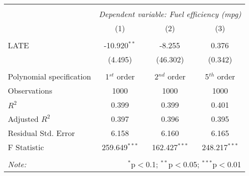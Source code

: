 \begin{tabular}{@{\extracolsep{5pt}}lccc}
\\[-1.8ex]\hline
\hline \\[-1.8ex]
& \multicolumn{3}{c}{\textit{Dependent variable: Fuel efficiency (mpg)}} \
\cr \cline{2-4}
\\[-1.8ex] & (1) & (2) & (3) \\
\hline \\[-1.8ex]
 LATE & -10.920$^{**}$ & -8.255$^{}$ & 0.376$^{}$ \\
& (4.495) & (46.302) & (0.342) \\
\hline \\[-1.8ex]
 Polynomial specification & 1$^{st}$ order & 2$^{nd}$ order & 5$^{th}$ order \\
 Observations & 1000 & 1000 & 1000 \\
 $R^2$ & 0.399 & 0.399 & 0.401 \\
 Adjusted $R^2$ & 0.397 & 0.396 & 0.395 \\
 Residual Std. Error & 6.158 & 6.160 & 6.165 \\
 F Statistic & 259.649$^{***}$ & 162.427$^{***}$ & 248.217$^{***}$ \\
\hline
\hline \\[-1.8ex]
\textit{Note:} & \multicolumn{3}{r}{$^{*}$p$<$0.1; $^{**}$p$<$0.05; $^{***}$p$<$0.01} \\
\end{tabular}
